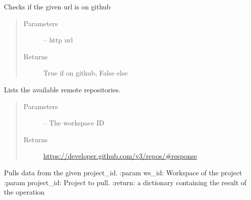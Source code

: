 \documentclass[letterpaper,10pt,english]{sphinxmanual}
\begin{document}

\begin{fulllineitems}
\label{_source/son_editor.impl:son_editor.impl.gitimpl.is_github}
Checks if the given url is on github
\begin{quote}\begin{description}
\item[{Parameters}] \leavevmode
{} -- http url

\item[{Returns}] \leavevmode
True if on github, False else

\end{description}\end{quote}

\end{fulllineitems}


\begin{fulllineitems}
\label{_source/son_editor.impl:son_editor.impl.gitimpl.list}
Lists the available remote repositories.
\begin{quote}\begin{description}
\item[{Parameters}] \leavevmode
{} -- The workspace ID

\item[{Returns}] \leavevmode
\url{https://developer.github.com/v3/repos/\#response}

\end{description}\end{quote}

\end{fulllineitems}


\begin{fulllineitems}
\label{_source/son_editor.impl:son_editor.impl.gitimpl.pull}
Pulls data from the given project\_id.
:param ws\_id: Workspace of the project
:param project\_id: Project to pull.
:return: a dictionary containing the result of the operation

\end{fulllineitems}
\end{document}
